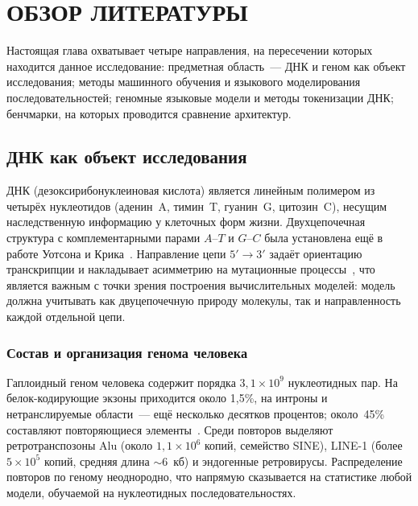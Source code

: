 \chapter{ОБЗОР ЛИТЕРАТУРЫ}

Настоящая глава охватывает четыре направления, на пересечении которых
находится данное исследование: предметная область~--- ДНК и геном как
объект исследования; методы машинного обучения и языкового
моделирования последовательностей; геномные языковые модели и методы
токенизации ДНК; бенчмарки, на которых проводится сравнение
архитектур.

\section{ДНК как объект исследования}

ДНК (дезоксирибонуклеиновая кислота) является линейным полимером из
четырёх нуклеотидов (аденин~A, тимин~T, гуанин~G, цитозин~C), несущим
наследственную информацию у клеточных форм жизни. Двухцепочечная
структура с комплементарными парами $A$--$T$ и $G$--$C$ была
установлена ещё в работе Уотсона и
Крика~\cite{watsonCrickMolecularStructure1953}. Направление цепи
$5' \to 3'$ задаёт ориентацию транскрипции и накладывает асимметрию на
мутационные процессы~\cite{rosenbergPatternsTransitionalMutation2003},
что является важным с точки зрения построения вычислительных моделей:
модель должна учитывать как двуцепочечную природу молекулы, так и
направленность каждой отдельной цепи.

\subsection{Состав и организация генома человека}

Гаплоидный геном человека содержит порядка $3{,}1 \times 10^9$
нуклеотидных пар. На белок-кодирующие экзоны приходится около 1{,}5\%,
на интроны и нетранслируемые области~--- ещё несколько десятков
процентов; около~45\% составляют повторяющиеся
элементы~\cite{landerInitialSequencingAnalysis2001}. Среди повторов
выделяют ретротранспозоны Alu (около $1{,}1 \times 10^6$ копий,
семейство SINE), LINE-1 (более $5 \times 10^5$ копий, средняя длина
${\sim}6$~кб) и эндогенные ретровирусы. Распределение повторов по
геному неоднородно, что напрямую сказывается на статистике любой
модели, обучаемой на нуклеотидных последовательностях.

